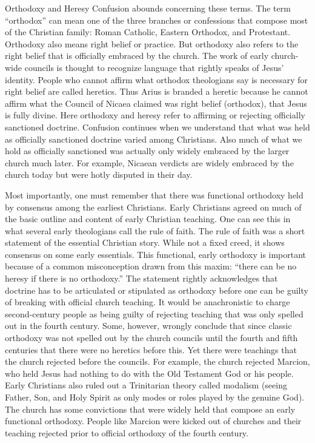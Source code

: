 \begin{sidebar}{Orthodoxy and Heresy}
Confusion abounds concerning these terms. The term “orthodox” can mean one of the three branches or
confessions that compose most of the Christian family: Roman Catholic, Eastern Orthodox, and
Protestant. Orthodoxy also means right belief or practice. But orthodoxy also refers to the right
belief that is officially embraced by the church. The work of early church-wide councils is thought
to recognize language that rightly speaks of Jesus’ identity. People who cannot affirm what orthodox
theologians say is necessary for right belief are called heretics. Thus Arius is branded a heretic
because he cannot affirm what the Council of Nicaea claimed was right belief (orthodox), that Jesus
is fully divine. Here orthodoxy and heresy refer to affirming or rejecting officially sanctioned
doctrine. Confusion continues when we understand that what was held as officially sanctioned
doctrine varied among Christians. Also much of what we hold as officially sanctioned was actually
only widely embraced by the larger church much later. For example, Nicaean verdicts are widely
embraced by the church today but were hotly disputed in their day.

Most importantly, one must remember that there was functional orthodoxy held by consensus among the
earliest Christians. Early Christians agreed on much of the basic outline and content of early
Christian teaching. One can see this in what several early theologians call the rule of faith. The
rule of faith was a short statement of the essential Christian story. While not a fixed creed, it
shows consensus on some early essentials. This functional, early orthodoxy is important because of a
common misconception drawn from this maxim: “there can be no heresy if there is no orthodoxy.” The
statement rightly acknowledges that doctrine has to be articulated or stipulated as orthodoxy before
one can be guilty of breaking with official church teaching. It would be anachronistic to charge
second-century people as being guilty of rejecting teaching that was only spelled out in the fourth
century. Some, however, wrongly conclude that since classic orthodoxy was not spelled out by the
church councils until the fourth and fifth centuries that there were no heretics before this. Yet
there were teachings that the church rejected before the councils. For example, the church rejected
Marcion, who held Jesus had nothing to do with the Old Testament God or his people. Early Christians
also ruled out a Trinitarian theory called modalism (seeing Father, Son, and Holy Spirit as only
modes or roles played by the genuine God). The church has some convictions that were widely held
that compose an early functional orthodoxy. People like Marcion were kicked out of churches and
their teaching rejected prior to official orthodoxy of the fourth century.
\end{sidebar}

